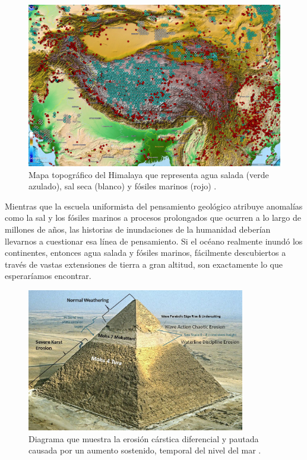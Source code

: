 \documentclass[10pt,twocolumn,letterpaper]{article}
\begin{document}
\begin{figure}[t]
\begin{center}
   \includegraphics[width=1\linewidth]{tibet.jpg}
\end{center}
   \caption{Mapa topográfico del Himalaya que representa agua salada (verde azulado), sal seca (blanco) y fósiles marinos (rojo) \cite{15,16,86,87}.}
\label{fig:3}
\label{fig:onecol}
\end{figure}

Mientras que la escuela uniformista del pensamiento geológico atribuye anomalías como la sal y los fósiles marinos a procesos prolongados que ocurren a lo largo de millones de años, las historias de inundaciones de la humanidad deberían llevarnos a cuestionar esa línea de pensamiento. Si el océano realmente inundó los continentes, entonces agua salada y fósiles marinos, fácilmente descubiertos a través de vastas extensiones de tierra a gran altitud, son exactamente lo que esperaríamos encontrar.

\begin{figure}[t]
\begin{center}
\includegraphics[width=0.85\textwidth]{khafre.jpg}
\end{center}
   \caption{Diagrama que muestra la erosión cárstica diferencial y pautada causada por un aumento sostenido, temporal del nivel del mar \cite{27}.}
\label{fig:4}
\end{figure}
\end{document}
